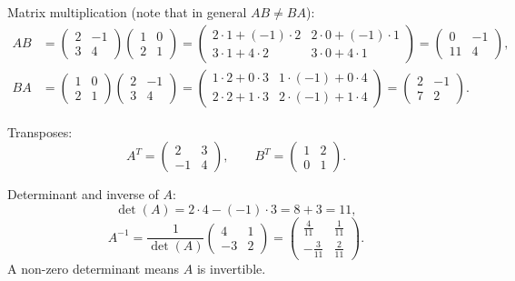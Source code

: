 \documentclass[11pt]{article}
\begin{document}
Matrix multiplication (note that in general $AB\neq BA$):
\begin{align*}
AB &= 
\begin{pmatrix}2 & -1 \\ 3 & 4\end{pmatrix}
\begin{pmatrix}1 & 0 \\ 2 & 1\end{pmatrix}
=
\begin{pmatrix}
2\cdot1 + (-1)\cdot2 & 2\cdot0 + (-1)\cdot1\\
3\cdot1 + 4\cdot2 & 3\cdot0 + 4\cdot1
\end{pmatrix}
=
\begin{pmatrix}0 & -1 \\ 11 & 4\end{pmatrix},\\[1ex]
BA &= 
\begin{pmatrix}1 & 0 \\ 2 & 1\end{pmatrix}
\begin{pmatrix}2 & -1 \\ 3 & 4\end{pmatrix}
=
\begin{pmatrix}
1\cdot2 + 0\cdot3 & 1\cdot(-1) + 0\cdot4\\
2\cdot2 + 1\cdot3 & 2\cdot(-1) + 1\cdot4
\end{pmatrix}
=
\begin{pmatrix}2 & -1 \\ 7 & 2\end{pmatrix}.
\end{align*}

Transposes:
\[
A^T = \begin{pmatrix}2 & 3 \\ -1 & 4\end{pmatrix},\qquad
B^T = \begin{pmatrix}1 & 2 \\ 0 & 1\end{pmatrix}.
\]

Determinant and inverse of $A$:
\[
\det(A) = 2\cdot 4 - (-1)\cdot 3 = 8+3 = 11,
\]
\[
A^{-1} = \frac1{\det(A)}
\begin{pmatrix}
4 & 1 \\ -3 & 2
\end{pmatrix}
=
\begin{pmatrix}
\frac{4}{11} & \frac{1}{11} \\
-\frac{3}{11} & \frac{2}{11}
\end{pmatrix}.
\]
A non-zero determinant means $A$ is invertible.
\end{document}

